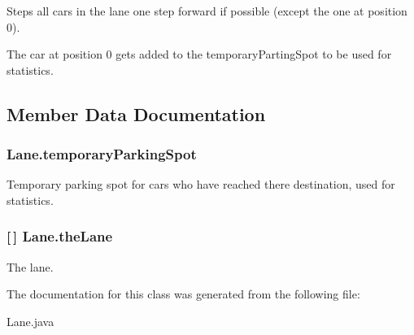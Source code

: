 Steps all cars in the lane one step forward if possible (except the one at position 0). 

The car at position 0 gets added to the temporary\+Parting\+Spot to be used for statistics. 

\subsection{Member Data Documentation}
\hypertarget{class_lane_abcd2ea6fa6aaa99b2b84e89a422c0377}{
\subsubsection[{temporary\+Parking\+Spot}]{ Lane.\+temporary\+Parking\+Spot\hspace{0.3cm}{\ttfamily [protected]}}}\label{class_lane_abcd2ea6fa6aaa99b2b84e89a422c0377}


Temporary parking spot for cars who have reached there destination, used for statistics. 

\hypertarget{class_lane_a0e18fcb829e23827ecc2610e6e8caf0b}{
\subsubsection[{the\+Lane}]{ \mbox{[}$\,$\mbox{]} Lane.\+the\+Lane\hspace{0.3cm}{\ttfamily [protected]}}}\label{class_lane_a0e18fcb829e23827ecc2610e6e8caf0b}


The lane. 



The documentation for this class was generated from the following file\+:\begin{DoxyCompactItemize}
\item 
Lane.\+java\end{DoxyCompactItemize}
